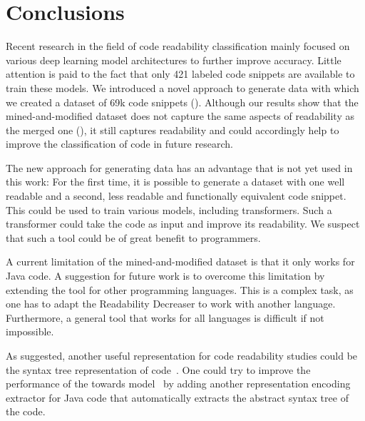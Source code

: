 \documentclass[%
class=scrreprt,
chapterprefix=false,%
open=right,%
twoside=false,%
paper=a4,%
logofile={Logo\_zentral\_farbig\_EN.png},%
thesistype=master,%
UKenglish,%
]{se2thesis}
\theoremstyle{definition}
\newcommand{\numSamples}{69k\xspace}
\newcommand{\RDH}{Readability Decreaser\xspace}
\begin{document}
\section{Conclusions} \label{Conclusions}
	Recent research in the field of code readability classification mainly focused on various deep learning model architectures to further improve accuracy. Little attention is paid to the fact that only 421 labeled code snippets are available to train these models. We introduced a novel approach to generate data with which we created a dataset of \numSamples code snippets (). Although our results show that the  mined-and-modified dataset does not capture the same aspects of readability as the merged one (), it still captures readability and could accordingly help to improve the classification of code in future research.
	
	The new approach for generating data has an advantage that is not yet used in this work: For the first time, it is possible to generate a dataset with one well readable and a second, less readable and functionally equivalent code snippet. This could be used to train various models, including transformers. Such a transformer could take the code as input and improve its readability. We suspect that such a tool could be of great benefit to programmers.
	
	A current limitation of the mined-and-modified dataset is that it only works for Java code. A suggestion for future work is to overcome this limitation by extending the tool for other programming languages. This is a complex task, as one has to adapt the \RDH to work with another language. Furthermore, a general tool that works for all languages is difficult if not impossible.
	
	
	As \citeauthor{mi2023graph} suggested, another useful representation for code readability studies could be the syntax tree representation of code~\cite{mi2023graph}. One could try to improve the performance of the towards model~\cite{mi2022towards} by adding another representation encoding extractor for Java code that automatically extracts the abstract syntax tree of the code.
	
\end{document}
